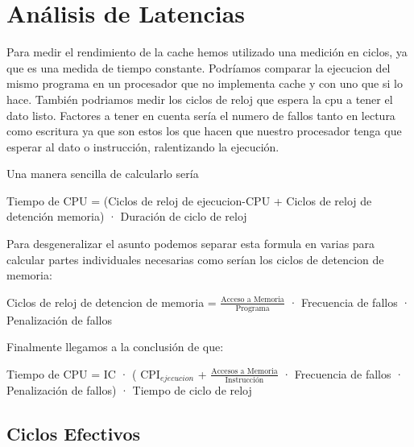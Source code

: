 \documentclass{article}
\begin{document}
\section{Análisis de Latencias}
Para medir el rendimiento de la cache hemos utilizado una medición en ciclos, ya que es una medida de tiempo constante. Podríamos comparar la ejecucion del mismo programa 
en un procesador que no implementa cache y con uno que si lo hace. También podriamos medir los ciclos de reloj que espera la cpu a tener el dato listo. Factores a tener en cuenta 
sería el numero de fallos tanto en lectura como escritura ya que son estos los que hacen que nuestro procesador tenga que esperar al dato o instrucción, ralentizando la ejecución.\cite{HennyPatt}\par
Una manera sencilla de calcularlo sería\par

\begin{adjustwidth}{2cm}{2cm}
\vspace{15pt}
Tiempo de CPU = (Ciclos de reloj de ejecucion-CPU + Ciclos de reloj de detención memoria) · Duración de ciclo de reloj
\vspace{15pt}
\end{adjustwidth}

Para desgeneralizar el asunto podemos separar esta formula en varias para calcular partes individuales necesarias como serían los ciclos de detencion de memoria:

\begin{adjustwidth}{2cm}{2cm}
\vspace{15pt}
  Ciclos de reloj de detencion de memoria = $\frac{\text{Acceso a Memoria}}{\text{Programa}}$ · Frecuencia de fallos · Penalización de fallos
\vspace{15pt}
\end{adjustwidth}

Finalmente llegamos a la conclusión de que:

\begin{adjustwidth}{2cm}{2cm}
\vspace{15pt}
  Tiempo de CPU = IC · ( CPI$_{ejecucion}$ + $\frac{\text{Accesos a Memoria}}{\text{Instrucción}}$ · Frecuencia de fallos · Penalización de fallos) · Tiempo de ciclo de reloj
\vspace{15pt}
\end{adjustwidth}

\subsection{Ciclos Efectivos}
\lipsum[9-10]
\end{document}
